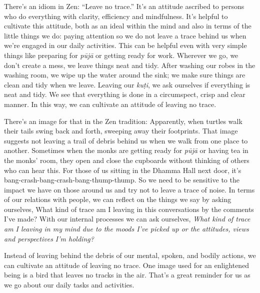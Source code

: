 
There's an idiom in Zen: ``Leave no trace.'' It's an attitude ascribed 
to persons who do everything with clarity, efficiency and mindfulness. 
It's helpful to cultivate this attitude, both as an ideal within the 
mind and also in terms of the little things we do: paying attention so 
we do not leave a trace behind us when we're engaged in our daily 
activities. This can be helpful even with very simple things like 
preparing for \emph{pūjā} or getting ready for work. Wherever we go, 
we don't create a mess, we leave things neat and tidy. After washing 
our robes in the washing room, we wipe up the water around the sink; we 
make sure things are clean and tidy when we leave. Leaving our 
\emph{kuṭi}, we ask ourselves if everything is neat and tidy. We see 
that everything is done in a circumspect, crisp and clear manner. In 
this way, we can cultivate an attitude of leaving no trace.

There's an image for that in the Zen tradition: Apparently, when 
turtles walk their tails swing back and forth, sweeping away their 
footprints. That image suggests not leaving a trail of debris behind us 
when we walk from one place to another. Sometimes when the monks are 
getting ready for \emph{pūjā} or having tea in the monks' room, they 
open and close the cupboards without thinking of others who can hear 
this. For those of us sitting in the Dhamma Hall next door, it's 
bang-crash-bang-crash-bang-thump-thump. So we need to be sensitive to 
the impact we have on those around us and try not to leave a trace of 
noise. In terms of our relations with people, we can reflect on the 
things we say by asking ourselves, What kind of trace am I leaving in 
this conversations by the comments I've made? With our internal 
processes we can ask ourselves, \emph{What kind of trace am I leaving 
in my mind due to the moods I've picked up or the attitudes, views and 
perspectives I'm holding?}

Instead of leaving behind the debris of our mental, spoken, and bodily 
actions, we can cultivate an attitude of leaving no trace. One image 
used for an enlightened being is a bird that leaves no tracks in the 
air. That's a great reminder for us as we go about our daily tasks and 
activities.

